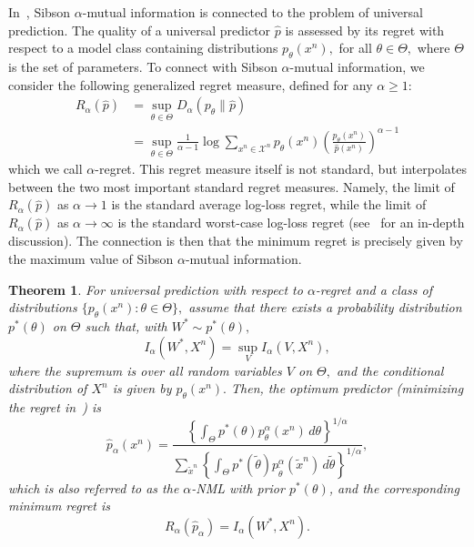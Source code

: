 \documentclass{article}
\newtheorem{theorem}{Theorem}
\numberwithin{theorem}{section}
\numberwithin{example}{section}
\numberwithin{remark}{section}
\numberwithin{definition}{section}
\begin{document}
In~\cite{BondaschiG:22isit,bondaschi2023alphanml}, Sibson $\alpha$-mutual information is connected to the problem of universal prediction.
The quality of a universal predictor $\hat{p}$ is assessed by its regret with respect to a model class containing distributions $p_{\theta}(x^n),$ for all $\theta \in {\Theta},$ where $\Theta$ is the set of parameters.
To connect with Sibson $\alpha$-mutual information, we
consider the following generalized regret measure, defined for any $\alpha \geq 1$:
\begin{equation}
\begin{split}
R_{\alpha}(\hat{p}) &= \sup_{\theta\in\Theta} D_{\alpha}(p_{\theta}\|\hat{p})\\&= \sup_{\theta\in\Theta} \frac{1}{\alpha-1} \log \sum_{x^n\in\mathcal{X}^n} p_{\theta}(x^n) \left(\frac{p_{\theta}(x^n)}{\hat{p}(x^n)}\right)^{\alpha -1} \label{sec-universalprediction-eq-alpharegret}
\end{split}
\end{equation}
which we call $\alpha$-regret.
This regret measure itself is not standard, but interpolates between the two most important standard regret measures. Namely, the limit of $R_{\alpha}(\hat{p})$ as $\alpha \rightarrow 1$ is the standard average log-loss regret, while the limit of $R_{\alpha}(\hat{p})$ as $\alpha \rightarrow \infty$ is the standard worst-case log-loss regret (see~\cite{bondaschi2023alphanml} for an in-depth discussion).
The connection is then that the minimum regret is precisely given by the maximum value of Sibson $\alpha$-mutual information.
\begin{theorem}
\label{thm-alphaNML-MaxIAlpha}
For universal prediction with respect to $\alpha$-regret and a class of distributions $\{ p_\theta(x^n) : \theta \in \Theta\},$
assume that there exists a probability distribution $p^*(\theta)$ on $\Theta$ such that, with $W^*\sim p^*(\theta),$
\begin{equation}
I_{\alpha}(W^*,X^n) = \sup_{V} I_{\alpha}(V,X^n),
\end{equation}
where the supremum is over all random variables $V$ on $\Theta,$ and the conditional distribution of $X^n$ is given by $p_\theta(x^n).$
Then, the optimum predictor (minimizing the regret in~) is
\begin{equation}
\hat{p}_{\alpha}(x^n) = \frac{\left\{\int_{\Theta} p^*(\theta)p_{\theta}^{\alpha}(x^n)\,d\theta\right\}^{1/\alpha}}{\sum_{\tilde{x}^n} \left\{\int_{\Theta} p^*(\tilde{\theta})p_{\tilde{\theta}}^{\alpha}(\tilde{x}^n)\,d\tilde{\theta}\right\}^{1/\alpha}},
\end{equation}
which is also referred to as the $\alpha$-NML with prior $p^*(\theta)$, and the corresponding minimum regret is
\begin{equation}
R_{\alpha}(\hat{p}_\alpha) = I_{\alpha}(W^*,X^n) .
\end{equation}
\end{theorem}
\end{document}
